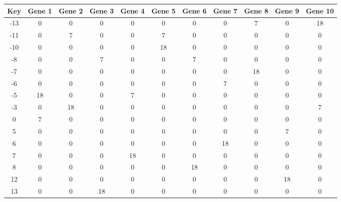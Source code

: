 \begin{tabular}{|c|c|c|c|c|c|c|c|c|c|c|}
\hline
Key & Gene 1 & Gene 2 & Gene 3 & Gene 4 & Gene 5 & Gene 6 & Gene 7 & Gene 8 & Gene 9 & Gene 10 \\
\hline
-13 & 0 & 0 & 0 & 0 & 0 & 0 & 0 & 7 & 0 & 18 \\
-11 & 0 & 7 & 0 & 0 & 7 & 0 & 0 & 0 & 0 & 0 \\
-10 & 0 & 0 & 0 & 0 & 18 & 0 & 0 & 0 & 0 & 0 \\
-8 & 0 & 0 & 7 & 0 & 0 & 7 & 0 & 0 & 0 & 0 \\
-7 & 0 & 0 & 0 & 0 & 0 & 0 & 0 & 18 & 0 & 0 \\
-6 & 0 & 0 & 0 & 0 & 0 & 0 & 7 & 0 & 0 & 0 \\
-5 & 18 & 0 & 0 & 7 & 0 & 0 & 0 & 0 & 0 & 0 \\
-3 & 0 & 18 & 0 & 0 & 0 & 0 & 0 & 0 & 0 & 7 \\
0 & 7 & 0 & 0 & 0 & 0 & 0 & 0 & 0 & 0 & 0 \\
5 & 0 & 0 & 0 & 0 & 0 & 0 & 0 & 0 & 7 & 0 \\
6 & 0 & 0 & 0 & 0 & 0 & 0 & 18 & 0 & 0 & 0 \\
7 & 0 & 0 & 0 & 18 & 0 & 0 & 0 & 0 & 0 & 0 \\
8 & 0 & 0 & 0 & 0 & 0 & 18 & 0 & 0 & 0 & 0 \\
12 & 0 & 0 & 0 & 0 & 0 & 0 & 0 & 0 & 18 & 0 \\
13 & 0 & 0 & 18 & 0 & 0 & 0 & 0 & 0 & 0 & 0 \\
\hline
\end{tabular}